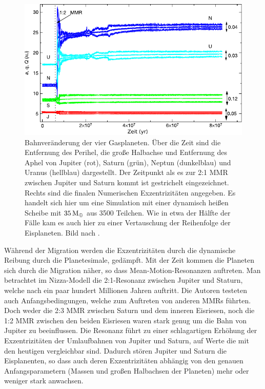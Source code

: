 \documentclass[12pt,a4paper,twoside]{article}
\renewcommand{\cite}{\citep}
\newcommand{\ME}{M_\oplus}
\begin{document}
\begin{figure}[tbn]
\centering
\includegraphics[scale=1]{img/Tsiganis2005-1.pdf}
\caption{Bahnveränderung der vier Gasplaneten. Über die Zeit sind die Entfernung des Perihel, die große Halbachse und Entfernung des Aphel von Jupiter (rot), Saturn (grün), Neptun (dunkelblau) und Uranus (hellblau) dargestellt. Der Zeitpunkt als es zur 2:1 MMR zwischen Jupiter und Saturn kommt ist gestrichelt eingezeichnet. Rechts sind die finalen Numerischen Exzentrizitäten angegeben. Es handelt sich hier um eine Simulation mit einer dynamisch heißen Scheibe mit $\unit[35]{\ME}$ aus 3500 Teilchen. Wie in etwa der Hälfte der Fälle kam es auch hier zu einer Vertauschung der Reihenfolge der Eisplaneten. Bild nach \cite{Tsiganis2005}.}
\label{fig:Orbitalevolution}
\end{figure}
Während der Migration werden die Exzentrizitäten durch die dynamische Reibung durch die Planetesimale, gedämpft\cite{Tsiganis2005}.
Mit der Zeit kommen die Planeten sich durch die Migration näher, so dass Mean-Motion-Resonanzen auftreten.
Man betrachtet im Nizza-Modell die 2:1-Resonanz zwischen Jupiter und Staturn, welche nach ein paar hundert Millionen Jahren auftritt.
Die Autoren testeten auch Anfangsbedingungen, welche zum Auftreten von anderen MMRs führten. Doch weder die 2:3 MMR zwischen Saturn und dem inneren Eisriesen, noch die 1:2 MMR zwischen den beiden Eisriesen waren stark genug um die Bahn von Jupiter zu beeinflussen\cite{Tsiganis2005}.
Die Resonanz führt zu einer schlagartigen Erhöhung der Exzentrizitäten der Umlaufbahnen von Jupiter und Saturn, auf Werte die mit den heutigen vergleichbar sind.
Dadurch stören Jupiter und Saturn die Eisplanenten, so dass auch deren Exzentrizitäten abhängig von den genauen Anfangsparametern (Massen und großen Halbachsen der Planeten) mehr oder weniger stark anwachsen\cite{Tsiganis2005}.
\end{document}
